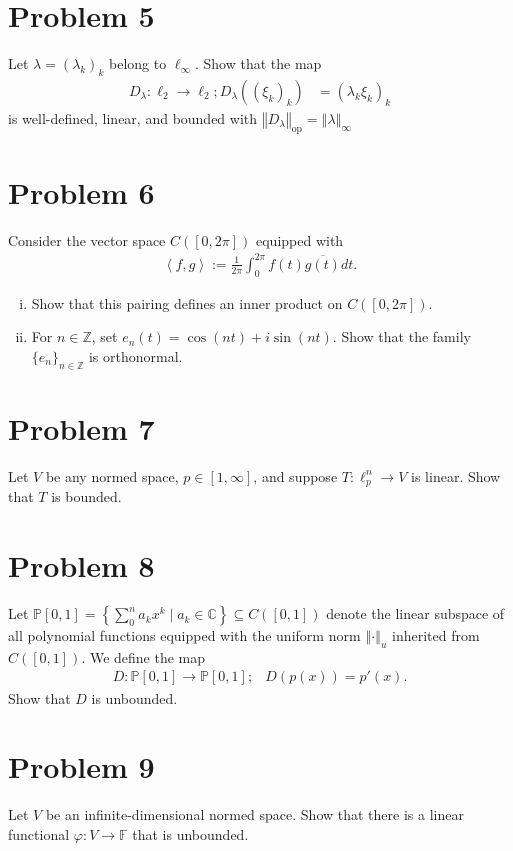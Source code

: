 \documentclass[10pt]{extarticle}
\newcommand{\Z}{\mathbb{Z}}
\newcommand{\C}{\mathbb{C}}
\newcommand{\iprod}[2]{\left\langle #1,#2\right\rangle}
\newcommand{\norm}[1]{\left\Vert #1\right\Vert}
\begin{document}
  \section{Problem 5}%
  Let $\lambda = (\lambda_k)_k$ belong to $\ell_{\infty}$. Show that the map
  \begin{align*}
    D_{\lambda}: \ell_{2}\rightarrow \ell_{2}; D_{\lambda}((\xi_k)_k) &= (\lambda_k\xi_k)_k
  \end{align*}
  is well-defined, linear, and bounded with $\norm{D_{\lambda}}_{\text{op}} = \norm{\lambda}_{\infty}$
  \section{Problem 6}%
  Consider the vector space $C([0,2\pi])$ equipped with
  \begin{align*}
    \iprod{f}{g} := \frac{1}{2\pi}\int_{0}^{2\pi}f(t)\overline{g(t)}dt.
  \end{align*}
  \begin{enumerate}[(i)]
    \item Show that this pairing defines an inner product on $C([0,2\pi])$.
    \item For $n\in\Z$, set $e_n(t) = \cos(nt) + i\sin(nt)$. Show that the family $\{e_n\}_{n\in\Z}$ is orthonormal.
  \end{enumerate}
  \section{Problem 7}%
  Let $V$ be any normed space, $p\in[1,\infty]$, and suppose $T:\ell_{p}^{n}\rightarrow V$ is linear. Show that $T$ is bounded.
  \section{Problem 8}%
  Let $\mathbb{P}[0,1] = \left\{\sum_{0}^{n}a_kx^k\mid a_k\in\C\right\}\subseteq C([0,1])$ denote the linear subspace of all polynomial functions equipped with the uniform norm $\norm{\cdot}_{u}$ inherited from $C([0,1])$. We define the map
  \begin{align*}
    D:\mathbb{P}[0,1]\rightarrow \mathbb{P}[0,1];&D(p(x)) = p'(x).
  \end{align*}
  Show that $D$ is unbounded.
  \section{Problem 9}%
  Let $V$ be an infinite-dimensional normed space. Show that there is a linear functional $\varphi: V\rightarrow \mathbb{F}$ that is unbounded.
\end{document}
